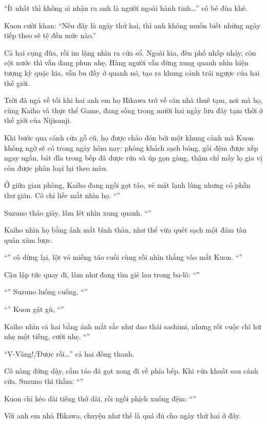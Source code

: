 \documentclass[../main.tex]{subfiles}
\begin{document}
``Ít nhất thì không ai nhận ra anh là người ngoài hành tinh\dots'' cô bé đùa khẽ.

Kuon cười khan: ``Nếu đây là ngày thứ hai, thì anh không muốn biết những ngày tiếp theo sẽ tệ đến mức nào.''

Cả hai cụng đũa, rồi im lặng nhìn ra cửa sổ. Ngoài kia, đèn phố nhấp nháy, còn cột nước thì vẫn đang phun nhẹ. Hàng người vẫn đứng xung quanh nhìn hiện tượng kỳ quặc kia, vẫn bu đầy ở quanh nó, tạo ra khung cảnh trái ngược của hai thế giới.

\ct

Trời đã ngả về tối khi hai anh em họ Hikawa trở về căn nhà thuê tạm, nơi mà họ, cùng Kaiho và thực thể Game, đang sống trong mười hai ngày lưu đày tạm thời ở thế giới của Nijisanji.

Khi bước qua cánh cửa gỗ cũ, họ được chào đón bởi một khung cảnh mà Kuon không ngờ sẽ có trong ngày hôm nay: phòng khách sạch bóng, gối đệm được xếp ngay ngắn, bát đĩa trong bếp đã được rửa và úp gọn gàng, thậm chí mấy lọ gia vị còn được phân loại lại theo màu.

Ở giữa gian phòng, Kaiho đang ngồi gọt táo, vẻ mặt lạnh lùng nhưng có phần thư giãn. Cô chỉ liếc mắt nhìn họ. ``''

Suzuno tháo giày, lấm lét nhìn xung quanh. ``''

Kaiho nhìn họ bằng ánh mắt bình thản, như thể vừa quét sạch một đám tàn quân xâm lược.

``'' cô dừng lại, lột vỏ miếng táo cuối cùng rồi nhìn thẳng vào mắt Kuon. ``''

Cậu lập tức quay đi, làm như đang tìm giẻ lau trong ba-lô: ``''

``'' Suzuno luống cuống. ``''

``'' Kuon gật gù, ``''

Kaiho nhìn cả hai bằng ánh mắt sắc như dao thái sashimi, nhưng rốt cuộc chỉ hừ nhẹ một tiếng, cười nhẹ. ``''

``V-Vâng!/Được rồi\dots'' cả hai đồng thanh.

Cô nàng đứng dậy, cầm táo đã gọt xong đi về phía bếp. Khi vừa khuất sau cánh cửa, Suzuno thì thầm: ``''

Kuon chỉ kéo dài tiếng thở dài, rồi ngồi phịch xuống đệm: ``''

Với anh em nhà Hikawa, chuyện như thế là quá đủ cho ngày thứ hai ở đây.
\end{document}
